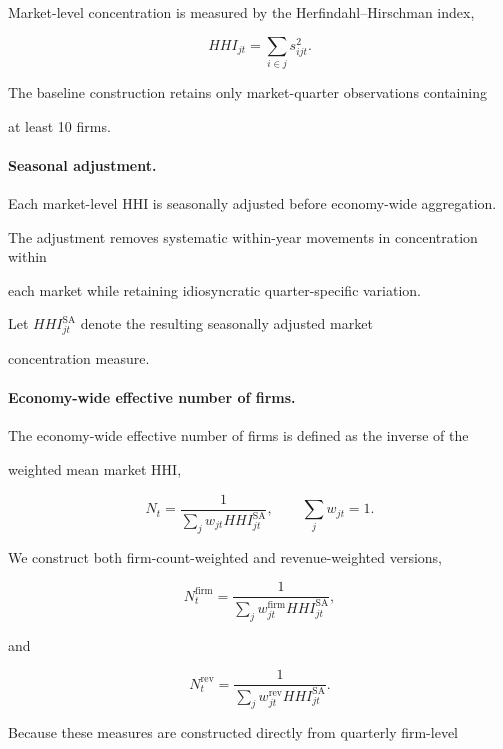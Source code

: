 \documentclass[11pt]{article}
\begin{document}
Market-level concentration is measured by the Herfindahl--Hirschman index,

\begin{equation}
HHI_{jt}
=
\sum_{i\in j}s_{ijt}^{2}.
\end{equation}

The baseline construction retains only market-quarter observations containing

at least 10 firms.

\paragraph{Seasonal adjustment.}

Each market-level HHI is seasonally adjusted before economy-wide aggregation.

The adjustment removes systematic within-year movements in concentration within

each market while retaining idiosyncratic quarter-specific variation.

Let $HHI_{jt}^{\mathrm{SA}}$ denote the resulting seasonally adjusted market

concentration measure.

\paragraph{Economy-wide effective number of firms.}

The economy-wide effective number of firms is defined as the inverse of the

weighted mean market HHI,

\begin{equation}
N_t
=
\frac{1}
{\sum_j w_{jt}HHI_{jt}^{\mathrm{SA}}},
\qquad
\sum_j w_{jt}=1.
\end{equation}

We construct both firm-count-weighted and revenue-weighted versions,

\begin{equation}
N_t^{\mathrm{firm}}
=
\frac{1}
{\sum_j w_{jt}^{\mathrm{firm}}HHI_{jt}^{\mathrm{SA}}},
\end{equation}

and

\begin{equation}
N_t^{\mathrm{rev}}
=
\frac{1}
{\sum_j w_{jt}^{\mathrm{rev}}HHI_{jt}^{\mathrm{SA}}}.
\end{equation}

Because these measures are constructed directly from quarterly firm-level
\end{document}
